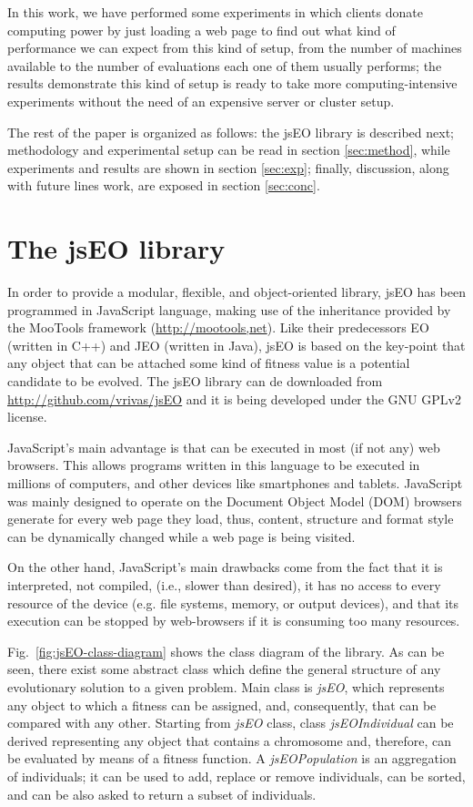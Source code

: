 \documentclass[runningheads,a4paper]{llncs}
\begin{document}
In this work, we have performed some experiments in which clients donate
computing power by just loading a web page to find out what kind of
performance we can expect from this kind of setup, from the number of
machines available to the number of evaluations each one of them
usually performs; the results demonstrate this kind of setup is ready to take more
computing-intensive experiments without the need of an expensive server or cluster
setup. 



The rest of the paper is organized as follows: the jsEO library is described next;  methodology and experimental setup can be read  in section \ref{sec:method}, while experiments and results are shown in section 
\ref{sec:exp}; finally, discussion, along with future lines work, are exposed in section \ref{sec:conc}.

\section{The jsEO library}
\label{sec:jseo}
In order to provide a modular, flexible, and object-oriented library, jsEO has been programmed in JavaScript language, making use of the inheritance provided by the MooTools framework (\url{http://mootools,net}). Like their predecessors EO (written in C++) and JEO (written in Java), jsEO is based on the key-point that any object that can be attached some kind of fitness value is a potential candidate to be evolved. The jsEO library can de downloaded from \url{http://github.com/vrivas/jsEO} and it is being developed under the GNU GPLv2 license.

JavaScript's main advantage is that can be executed in most (if not any) web browsers. This allows programs written in this language to be executed in millions of computers, and other devices like smartphones and tablets. JavaScript was mainly designed to operate on the Document Object Model (DOM) browsers generate for every web page they load, thus, content, structure and format style can be dynamically changed while a web page is being visited.

On the other hand, JavaScript's main drawbacks come from the fact that it is interpreted, not compiled, (i.e., slower than desired), it has no access to every resource of the device (e.g. file systems,  memory, or output devices), and that its execution can be stopped by web-browsers if it is consuming too many resources.

Fig.~\ref{fig:jsEO-class-diagram} shows the class diagram of the library. As can be seen, there exist some abstract class which define the general structure of any evolutionary solution to a given problem. Main class is \textit{jsEO}, which represents any object to which a fitness can be assigned, and, consequently, that can be compared with any other. Starting from \textit{jsEO} class, class \textit{jsEOIndividual} can be derived representing any object that contains a chromosome and, therefore, can be evaluated by means of a fitness function. A \textit{jsEOPopulation} is an aggregation of individuals; it can be used to add, replace or remove individuals, can be sorted, and can be also asked to return a subset of individuals.
\end{document}

